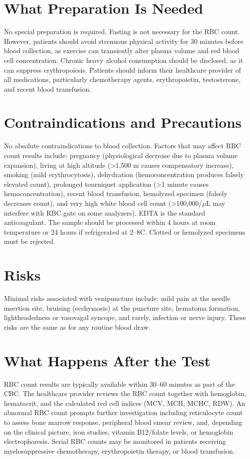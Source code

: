 \section*{What Preparation Is Needed}
No special preparation is required. Fasting is not necessary for the RBC count. However, patients should avoid strenuous physical activity for 30 minutes before blood collection, as exercise can transiently alter plasma volume and red blood cell concentration. Chronic heavy alcohol consumption should be disclosed, as it can suppress erythropoiesis. Patients should inform their healthcare provider of all medications, particularly chemotherapy agents, erythropoietin, testosterone, and recent blood transfusion.

\section*{Contraindications and Precautions}
No absolute contraindications to blood collection. Factors that may affect RBC count results include: pregnancy (physiological decrease due to plasma volume expansion), living at high altitude (>1,500 m causes compensatory increase), smoking (mild erythrocytosis), dehydration (hemoconcentration produces falsely elevated count), prolonged tourniquet application (>1 minute causes hemoconcentration), recent blood transfusion, hemolyzed specimen (falsely decreases count), and very high white blood cell count (>100,000/$\mu$L may interfere with RBC gate on some analyzers). EDTA is the standard anticoagulant. The sample should be processed within 4 hours at room temperature or 24 hours if refrigerated at 2--8\textdegree{}C. Clotted or hemolyzed specimens must be rejected.

\section*{Risks}
Minimal risks associated with venipuncture include: mild pain at the needle insertion site, bruising (ecchymosis) at the puncture site, hematoma formation, lightheadedness or vasovagal syncope, and rarely, infection or nerve injury. These risks are the same as for any routine blood draw.

\section*{What Happens After the Test}
RBC count results are typically available within 30--60 minutes as part of the CBC. The healthcare provider reviews the RBC count together with hemoglobin, hematocrit, and the calculated red cell indices (MCV, MCH, MCHC, RDW). An abnormal RBC count prompts further investigation including reticulocyte count to assess bone marrow response, peripheral blood smear review, and, depending on the clinical picture, iron studies, vitamin B12/folate levels, or hemoglobin electrophoresis. Serial RBC counts may be monitored in patients receiving myelosuppressive chemotherapy, erythropoietin therapy, or blood transfusion.

